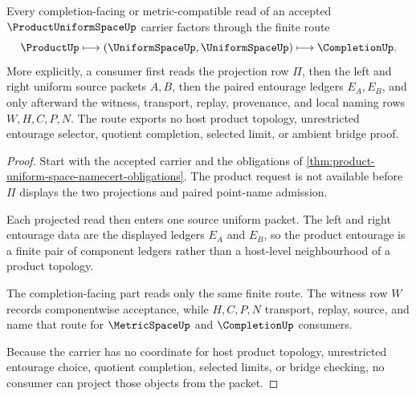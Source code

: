 \begin{theorem}
\label{thm:product-uniform-space-projection-entourage-route}
Every completion-facing or metric-compatible read of an accepted $\ProductUniformSpaceUp$ carrier factors through the finite route
$$
\ProductUp \longmapsto (\UniformSpaceUp,\UniformSpaceUp) \longmapsto \CompletionUp .
$$
More explicitly, a consumer first reads the projection row $\Pi$, then the left and right uniform source packets $A,B$, then the paired entourage ledgers $E_A,E_B$, and only afterward the witness, transport, replay, provenance, and local naming rows $W,H,C,P,N$. The route exports no host product topology, unrestricted entourage selector, quotient completion, selected limit, or ambient bridge proof.
\end{theorem}
\begin{proof}
Start with the accepted carrier and the obligations of \autoref{thm:product-uniform-space-namecert-obligations}. The product request is not available before $\Pi$ displays the two projections and paired point-name admission.

Each projected read then enters one source uniform packet. The left and right entourage data are the displayed ledgers $E_A$ and $E_B$, so the product entourage is a finite pair of component ledgers rather than a host-level neighbourhood of a product topology.

The completion-facing part reads only the same finite route. The witness row $W$ records componentwise acceptance, while $H,C,P,N$ transport, replay, source, and name that route for $\MetricSpaceUp$ and $\CompletionUp$ consumers.

Because the carrier has no coordinate for host product topology, unrestricted entourage choice, quotient completion, selected limits, or bridge checking, no consumer can project those objects from the packet.
\end{proof}


